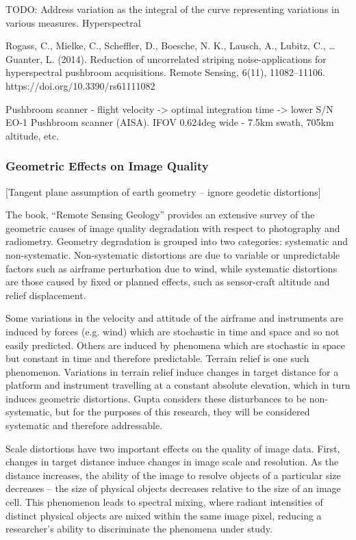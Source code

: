 \documentclass[10pt]{article}
\begin{document}
TODO: Address variation as the integral of the curve representing variations in various measures.
Hyperspectral

\cite{Rogass2014}
Rogass, C., Mielke, C., Scheffler, D., Boesche, N. K., Lausch, A., Lubitz, C., … Guanter, L. (2014). Reduction of uncorrelated striping noise-applications for hyperspectral pushbroom acquisitions. Remote Sensing, 6(11), 11082–11106. https://doi.org/10.3390/rs61111082

Pushbroom scanner - flight velocity -> optimal integration time -> lower S/N
EO-1 Pushbroom scanner (AISA).
IFOV 0.624deg wide - 7.5km swath, 705km altitude, etc.


\subsubsection{Geometric Effects on Image Quality}

[Tangent plane assumption of earth geometry -- ignore geodetic distortions]

The book, ``Remote Sensing Geology'' \cite{Gupta2018} provides an extensive survey of the geometric causes of image quality degradation with respect to photography and radiometry. Geometry degradation is grouped into two categories: systematic and non-systematic. Non-systematic distortions are due to variable or unpredictable factors such as airframe perturbation due to wind, while systematic distortions are those caused by fixed or planned effects, such as sensor-craft altitude and relief displacement.

Some variations in the velocity and attitude of the airframe and instruments are induced by forces (e.g. wind) which are stochastic in time and space and so not easily predicted. Others are induced by phenomena which are stochastic in space but constant in time and therefore predictable. Terrain relief is one such phenomenon. Variations in terrain relief induce changes in target distance for a platform and instrument travelling at a constant absolute elevation, which in turn induces geometric distortions. Gupta \cite{Gupta2018} considers these disturbances to be non-systematic, but for the purposes of this research, they will be considered systematic and therefore addressable.

Scale distortions have two important effects on the quality of image data. First, changes in target distance induce changes in image scale and resolution. As the distance increases, the ability of the image to resolve objects of a particular size decreases -- the size of physical objects decreases relative to the size of an image cell. This phenomenon leads to spectral mixing, where radiant intensities of distinct physical objects are mixed within the same image pixel, reducing a researcher's ability to discriminate the phenomena under study.
\end{document}
